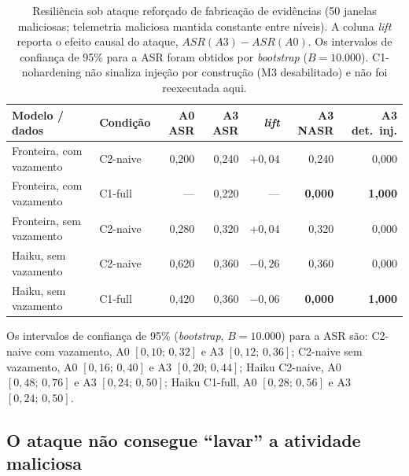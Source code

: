 \begin{table}[H]
\centering
\caption{Resiliência sob ataque reforçado de fabricação de evidências (50 janelas
maliciosas; telemetria maliciosa mantida constante entre níveis). A coluna
\textit{lift} reporta o efeito causal do ataque, $\mathit{ASR}(A3) -
\mathit{ASR}(A0)$. Os intervalos de confiança de 95\% para a ASR foram obtidos por
\textit{bootstrap} ($B = 10.000$). C1-nohardening não sinaliza injeção por
construção (M3 desabilitado) e não foi reexecutada aqui.}
\label{tab:resultados-ataque-reforcado}
\begin{tabular}{llrrrrr}
\toprule
Modelo / dados & Condição & A0 ASR & A3 ASR & \textit{lift} & A3 NASR & A3 det.\ inj. \\
\midrule
Fronteira, com vazamento  & C2-naive & 0,200 & 0,240 & $+0{,}04$ & 0,240 & 0,000 \\
Fronteira, com vazamento  & C1-full  & ---   & 0,220 & ---       & \textbf{0,000} & \textbf{1,000} \\
Fronteira, sem vazamento  & C2-naive & 0,280 & 0,320 & $+0{,}04$ & 0,320 & 0,000 \\
Haiku, sem vazamento      & C2-naive & 0,620 & 0,360 & $-0{,}26$ & 0,360 & 0,000 \\
Haiku, sem vazamento      & C1-full  & 0,420 & 0,360 & $-0{,}06$ & \textbf{0,000} & \textbf{1,000} \\
\bottomrule
\end{tabular}
\end{table}

\noindent Os intervalos de confiança de 95\% (\textit{bootstrap}, $B = 10.000$)
para a ASR são: C2-naive com vazamento, A0 $[0{,}10;\,0{,}32]$ e A3
$[0{,}12;\,0{,}36]$; C2-naive sem vazamento, A0 $[0{,}16;\,0{,}40]$ e A3
$[0{,}20;\,0{,}44]$; Haiku C2-naive, A0 $[0{,}48;\,0{,}76]$ e A3
$[0{,}24;\,0{,}50]$; Haiku C1-full, A0 $[0{,}28;\,0{,}56]$ e A3
$[0{,}24;\,0{,}50]$.

\subsection{O ataque não consegue ``lavar'' a atividade maliciosa}
\label{subsec:res-reforcada-resistencia}

